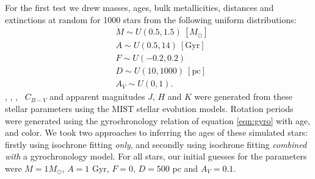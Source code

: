 For the first test we drew masses, ages, bulk metallicities, distances and
extinctions at random for 1000 stars from the following uniform distributions:
\begin{eqnarray}
& M \sim U(0.5, 1.5)~[M_\odot] \\
& A \sim U(0.5, 14)\mathrm{~[Gyr]} \\
& F \sim U(-0.2, 0.2) \\
& D \sim U(10, 1000)~\mathrm{[pc]} \\
& A_V \sim U(0, 1).
\end{eqnarray}
\teff, \logg, \fhat, \pmega\, $C_{B-V}$ and apparent magnitudes $J$, $H$ and
$K$ were generated from these stellar parameters using the MIST stellar
evolution models.
Rotation periods were generated using the gyrochronology relation of
equation \ref{eqn:gyro} with age, and color.
We took two approaches to inferring the ages of these simulated stars:
firstly using isochrone fitting {\it only}, and secondly using isochrone
fitting {\it combined with} a gyrochronology model.
For all stars, our initial guesses for the parameters were $M = 1M_\odot$,
$A = 1$ Gyr, $F = 0$, $D = 500$ pc and $A_V = 0.1$.

